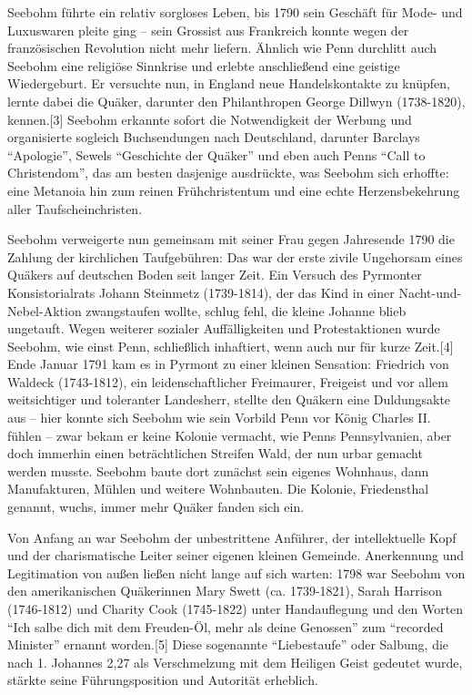 \medskip

Seebohm führte ein relativ sorgloses Leben, bis 1790 sein Geschäft für Mode- und
Luxuswaren pleite ging – sein Grossist aus Frankreich konnte wegen der
französischen Revolution nicht mehr liefern. Ähnlich wie Penn durchlitt auch
Seebohm eine religiöse Sinnkrise und erlebte anschließend eine geistige
Wiedergeburt. Er versuchte nun, in England neue Handelskontakte zu knüpfen,
lernte dabei die Quäker, darunter den Philanthropen George Dillwyn (1738-1820),
kennen.[3] Seebohm erkannte sofort die Notwendigkeit der Werbung und
organisierte sogleich Buchsendungen nach Deutschland, darunter Barclays
"`Apologie"', Sewels "`Geschichte der Quäker"' und eben auch Penns "`Call to
Christendom"', das am besten dasjenige ausdrückte, was Seebohm sich erhoffte:
eine Metanoia hin zum reinen Frühchristentum und eine echte Herzensbekehrung
aller Taufscheinchristen.

\medskip

Seebohm verweigerte nun gemeinsam mit seiner Frau gegen Jahresende 1790 die
Zahlung der kirchlichen Taufgebühren: Das war der erste zivile Ungehorsam eines
Quäkers auf deutschen Boden seit langer Zeit. Ein Versuch des Pyrmonter
Konsistorialrats Johann Steinmetz (1739-1814), der das Kind in einer
Nacht-und-Nebel-Aktion zwangstaufen wollte, schlug fehl, die kleine Johanne
blieb ungetauft. Wegen weiterer sozialer Auffälligkeiten und Protestaktionen
wurde Seebohm, wie einst Penn, schließlich inhaftiert, wenn auch nur für kurze
Zeit.[4] Ende Januar 1791 kam es in Pyrmont zu einer kleinen Sensation:
Friedrich von Waldeck (1743-1812), ein leidenschaftlicher Freimaurer, Freigeist
und vor allem weitsichtiger und toleranter Landesherr, stellte den Quäkern eine
Duldungsakte aus – hier konnte sich Seebohm wie sein Vorbild Penn vor König
Charles II. fühlen – zwar bekam er keine Kolonie vermacht, wie Penns
Pennsylvanien, aber doch immerhin einen beträchtlichen Streifen Wald, der nun
urbar gemacht werden musste. Seebohm baute dort zunächst sein eigenes Wohnhaus,
dann Manufakturen, Mühlen und weitere Wohnbauten. Die Kolonie, Friedensthal
genannt, wuchs, immer mehr Quäker fanden sich ein.

\medskip

Von Anfang an war Seebohm der unbestrittene Anführer, der intellektuelle Kopf
und der charismatische Leiter seiner eigenen kleinen Gemeinde. Anerkennung und
Legitimation von außen ließen nicht lange auf sich warten: 1798 war Seebohm von
den amerikanischen Quäkerinnen Mary Swett (ca. 1739-1821), Sarah Harrison
(1746-1812) und Charity Cook (1745-1822) unter Handauflegung und den Worten
"`Ich salbe dich mit dem Freuden-Öl, mehr als deine Genossen"' zum "`recorded
Minister"' ernannt worden.[5] Diese sogenannte "`Liebestaufe"' oder Salbung, die
nach 1. Johannes 2,27 als Verschmelzung mit dem Heiligen Geist gedeutet wurde,
stärkte seine Führungsposition und Autorität erheblich.

